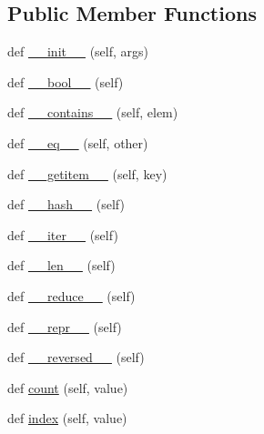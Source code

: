 \subsection*{Public Member Functions}
\begin{DoxyCompactItemize}
\item 
def \hyperlink{classsetuptools_1_1__vendor_1_1more__itertools_1_1more_1_1numeric__range_a7df5576bfe2a38d0d1428f8680f9f16f}{\+\_\+\+\_\+init\+\_\+\+\_\+} (self, args)
\item 
def \hyperlink{classsetuptools_1_1__vendor_1_1more__itertools_1_1more_1_1numeric__range_a332ca2c85bf0406566c4e2046b73f1dd}{\+\_\+\+\_\+bool\+\_\+\+\_\+} (self)
\item 
def \hyperlink{classsetuptools_1_1__vendor_1_1more__itertools_1_1more_1_1numeric__range_add9700db1c04674af8d556835481fbff}{\+\_\+\+\_\+contains\+\_\+\+\_\+} (self, elem)
\item 
def \hyperlink{classsetuptools_1_1__vendor_1_1more__itertools_1_1more_1_1numeric__range_aff80c3ddd0965ddddff1a75debc36da8}{\+\_\+\+\_\+eq\+\_\+\+\_\+} (self, other)
\item 
def \hyperlink{classsetuptools_1_1__vendor_1_1more__itertools_1_1more_1_1numeric__range_a36a28e82ef8c11c2dfc7d9ec0624380f}{\+\_\+\+\_\+getitem\+\_\+\+\_\+} (self, key)
\item 
def \hyperlink{classsetuptools_1_1__vendor_1_1more__itertools_1_1more_1_1numeric__range_a10dd022669ae08d1de8752208fa0f3a8}{\+\_\+\+\_\+hash\+\_\+\+\_\+} (self)
\item 
def \hyperlink{classsetuptools_1_1__vendor_1_1more__itertools_1_1more_1_1numeric__range_a58f4bb1aef339043b63608ebce09ef1f}{\+\_\+\+\_\+iter\+\_\+\+\_\+} (self)
\item 
def \hyperlink{classsetuptools_1_1__vendor_1_1more__itertools_1_1more_1_1numeric__range_a0fc66ae6b79a7424e55573ad31985c08}{\+\_\+\+\_\+len\+\_\+\+\_\+} (self)
\item 
def \hyperlink{classsetuptools_1_1__vendor_1_1more__itertools_1_1more_1_1numeric__range_a6e1d5f829127444edd7437e89ac405a3}{\+\_\+\+\_\+reduce\+\_\+\+\_\+} (self)
\item 
def \hyperlink{classsetuptools_1_1__vendor_1_1more__itertools_1_1more_1_1numeric__range_a5bb35f65639f428405292c9d5d6bdee2}{\+\_\+\+\_\+repr\+\_\+\+\_\+} (self)
\item 
def \hyperlink{classsetuptools_1_1__vendor_1_1more__itertools_1_1more_1_1numeric__range_a83b517e7c46af3a7f81236ce6792c21a}{\+\_\+\+\_\+reversed\+\_\+\+\_\+} (self)
\item 
def \hyperlink{classsetuptools_1_1__vendor_1_1more__itertools_1_1more_1_1numeric__range_ac6193d9f343a8604d8262f8166c4ab60}{count} (self, value)
\item 
def \hyperlink{classsetuptools_1_1__vendor_1_1more__itertools_1_1more_1_1numeric__range_a394db59afc76561009e55b38d2254d97}{index} (self, value)
\end{DoxyCompactItemize}


